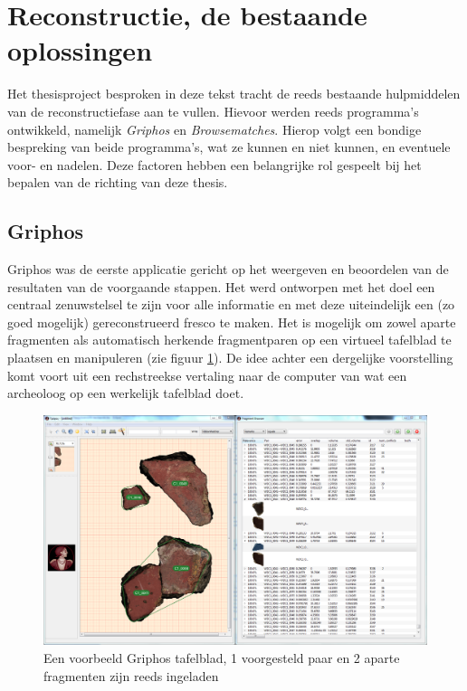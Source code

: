 \section{Reconstructie, de bestaande oplossingen}
Het thesisproject besproken in deze tekst tracht de reeds bestaande hulpmiddelen van de reconstructiefase aan te vullen. Hievoor werden reeds programma's ontwikkeld, namelijk \emph{Griphos} en \emph{Browsematches}. Hierop volgt een bondige bespreking van beide programma's, wat ze kunnen en niet kunnen, en eventuele voor- en nadelen. Deze factoren hebben een belangrijke rol gespeelt bij het bepalen van de richting van deze thesis.

\subsection{Griphos}

Griphos was de eerste applicatie gericht op het weergeven en beoordelen van de resultaten van de voorgaande stappen. Het werd ontworpen met het doel een centraal zenuwstelsel te zijn voor alle informatie en met deze uiteindelijk een (zo goed mogelijk) gereconstrueerd fresco te maken. Het is mogelijk om zowel aparte fragmenten als automatisch herkende fragmentparen op een virtueel tafelblad te plaatsen en manipuleren (zie figuur \ref{fig:griphostafelblad}). De idee achter een dergelijke voorstelling komt voort uit een rechstreekse vertaling naar de computer van wat een archeoloog op een werkelijk tafelblad doet.\\

\begin{figure}[ht]
	\begin{center}
		\includegraphics[width=.8\columnwidth]{images/griphos-01-cut.png}
		\caption{Een voorbeeld Griphos tafelblad, 1 voorgesteld paar en 2 aparte fragmenten zijn reeds ingeladen}
		\label{fig:griphostafelblad}
	\end{center}
\end{figure}

